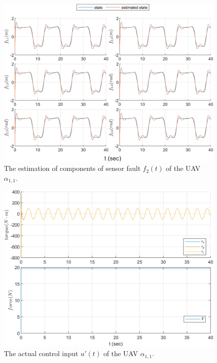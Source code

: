 \documentclass{ieeeaccess}
\begin{document}
\begin{figure}[htbp]
    \centering
    \includegraphics[scale=.57]{fig/uav (3).png}\caption{The estimation of components of sensor fault $f_2(t)$ of the UAV $\alpha_{1,1}$.}%
    \label{fig:UAV, fs}
\end{figure}
\begin{figure}[htbp]
    \centering
    \includegraphics[scale=.57]{fig/uav (4).png}\caption{The actual control input $u'(t)$ of the UAV $\alpha_{1,1}$.}%
    \label{fig:UAV, control}
\end{figure}
\end{document}
